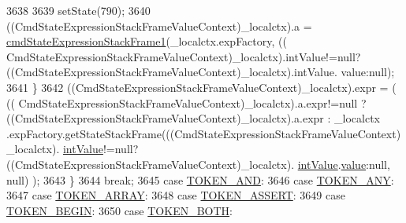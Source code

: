 \begin{DoxyCode}
3638 
3639         setState(790);
3640         ((CmdStateExpressionStackFrameValueContext)\_localctx).a = 
      \hyperlink{classgov_1_1nasa_1_1jpf_1_1inspector_1_1server_1_1expression_1_1parser_1_1_expression_grammar_parser_a7b51fc0f0baff269b98a4705322e2242}{cmdStateExpressionStackFrame1}(\_localctx.expFactory, ((
      CmdStateExpressionStackFrameValueContext)\_localctx).intValue!=null?((CmdStateExpressionStackFrameValueContext)\_localctx).intValue.
      value:null);
3641         \}
3642          ((CmdStateExpressionStackFrameValueContext)\_localctx).expr =  ( ((
      CmdStateExpressionStackFrameValueContext)\_localctx).a.expr!=null ? ((CmdStateExpressionStackFrameValueContext)\_localctx).a.expr :  \_localctx
      .expFactory.getStateStackFrame(((CmdStateExpressionStackFrameValueContext)\_localctx).
      \hyperlink{classgov_1_1nasa_1_1jpf_1_1inspector_1_1server_1_1expression_1_1parser_1_1_expression_grammar_parser_a8c7e4b657a12e07efe3ea6429cb9cdcf}{intValue}!=null?((CmdStateExpressionStackFrameValueContext)\_localctx).
      \hyperlink{classgov_1_1nasa_1_1jpf_1_1inspector_1_1server_1_1expression_1_1parser_1_1_expression_grammar_parser_a8c7e4b657a12e07efe3ea6429cb9cdcf}{intValue}.\hyperlink{classgov_1_1nasa_1_1jpf_1_1inspector_1_1server_1_1expression_1_1parser_1_1_expression_grammar_parser_1_1_int_value_context_a4c7175811f1802632486ad762d032ad5}{value}:null, null) ); 
3643         \}
3644         \textcolor{keywordflow}{break};
3645       \textcolor{keywordflow}{case} \hyperlink{classgov_1_1nasa_1_1jpf_1_1inspector_1_1server_1_1expression_1_1parser_1_1_expression_grammar_parser_a331667ae98e64b4bcdd3b866e7e2cd64}{TOKEN\_AND}:
3646       \textcolor{keywordflow}{case} \hyperlink{classgov_1_1nasa_1_1jpf_1_1inspector_1_1server_1_1expression_1_1parser_1_1_expression_grammar_parser_a21f8df7c638568302922694eab614972}{TOKEN\_ANY}:
3647       \textcolor{keywordflow}{case} \hyperlink{classgov_1_1nasa_1_1jpf_1_1inspector_1_1server_1_1expression_1_1parser_1_1_expression_grammar_parser_a5245a46acb46b8f00f1e7ef7d32101ea}{TOKEN\_ARRAY}:
3648       \textcolor{keywordflow}{case} \hyperlink{classgov_1_1nasa_1_1jpf_1_1inspector_1_1server_1_1expression_1_1parser_1_1_expression_grammar_parser_a5965ddc9ea8411ed43e28f73def173d2}{TOKEN\_ASSERT}:
3649       \textcolor{keywordflow}{case} \hyperlink{classgov_1_1nasa_1_1jpf_1_1inspector_1_1server_1_1expression_1_1parser_1_1_expression_grammar_parser_aeb1f6ac15295275b80fae4b59d753627}{TOKEN\_BEGIN}:
3650       \textcolor{keywordflow}{case} \hyperlink{classgov_1_1nasa_1_1jpf_1_1inspector_1_1server_1_1expression_1_1parser_1_1_expression_grammar_parser_adb1cf23ee91ded4bcbbba7860c7e27ff}{TOKEN\_BOTH}:

\end{DoxyCode}
